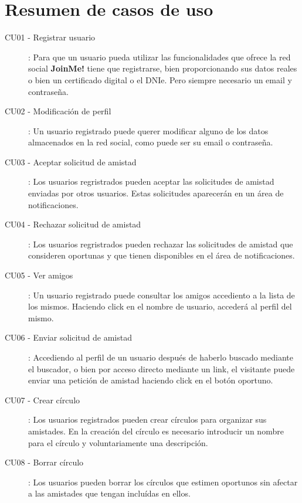 \documentclass[12pt, a4paper, titlepage]{article}
\begin{document}
\section{Resumen de casos de uso}

\begin{description}
    \item [CU01 - Registrar usuario]: Para que un usuario pueda utilizar las funcionalidades que ofrece la red social \textbf{JoinMe!} tiene que registrarse, bien proporcionando sus datos reales o bien un certificado digital
o el DNIe. Pero siempre necesario un email y contraseña.
   	\item [CU02 - Modificación de perfil]: Un usuario registrado puede querer modificar alguno de los datos almacenados en la red social, como puede ser su email o contraseña.
    \item [CU03 - Aceptar solicitud de amistad]: Los usuarios regristrados pueden aceptar las solicitudes de amistad enviadas por otros usuarios. Estas solicitudes aparecerán en un área de notificaciones.
    
    \item [CU04 - Rechazar solicitud de amistad]: Los usuarios regristrados pueden rechazar las solicitudes de amistad que consideren oportunas y que tienen disponibles en el área de notificaciones.
    
    \item [CU05 - Ver amigos]: Un usuario registrado puede consultar los amigos accediento a la lista de los mismos. Haciendo click en el nombre de usuario, accederá al perfil del mismo.
    
    \item [CU06 - Enviar solicitud de amistad]: Accediendo al perfil de un usuario después de haberlo buscado mediante el buscador, o bien por acceso directo mediante un link, el visitante puede enviar una petición de amistad haciendo click en el botón oportuno.
    
    \item [CU07 - Crear círculo]: Los usuarios registrados pueden crear círculos para organizar sus amistades. En la creación del círculo es necesario introducir un nombre para el círculo y voluntariamente una descripción.
    
    \item [CU08 - Borrar círculo]: Los usuarios pueden borrar los círculos que estimen oportunos sin afectar a las amistades que tengan incluídas en ellos.
    

\end{description}
\end{document}
